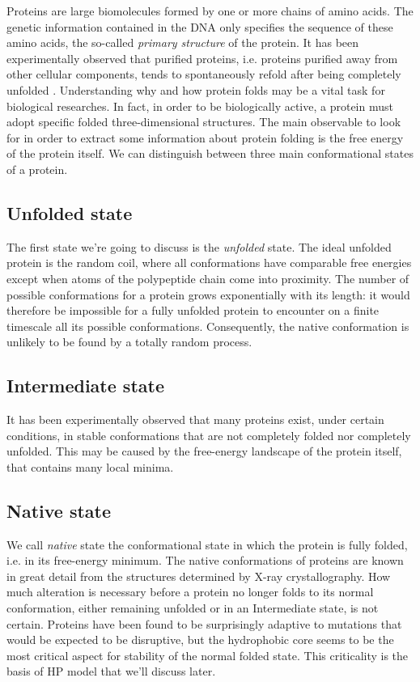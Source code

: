 Proteins are large biomolecules formed by one or more chains of amino acids.
The genetic information contained in the DNA only specifies the sequence of these amino acids, the so-called \emph{primary structure} of the protein.
It has been experimentally observed that purified proteins, i.e. proteins purified away from other cellular components, tends to spontaneously refold after being completely unfolded \cite{ProteinFolding1990}.
Understanding why and how protein folds may be a vital task for biological researches.
In fact, in order to be biologically active, a protein must adopt specific folded three-dimensional structures.
The main observable to look for in order to extract some information about protein folding is the free energy of the protein itself.
We can distinguish between three main conformational states of a protein.

\subsection*{Unfolded state}
The first state we're going to discuss is the \emph{unfolded} state.
The ideal unfolded protein is the random coil, where all conformations have comparable free energies except when atoms of the polypeptide chain come into proximity.
The number of possible conformations for a protein grows exponentially with its length: it would therefore be impossible for a fully unfolded protein to encounter on a finite timescale all its possible conformations.
Consequently, the native conformation is unlikely to be found by a totally random process.

\subsection*{Intermediate state}
It has been experimentally observed that many proteins exist, under certain conditions, in stable conformations that are not completely folded nor completely unfolded.
This may be caused by the free-energy landscape of the protein itself, that contains many local minima.


\subsection*{Native state}
We call \emph{native} state the conformational state in which the protein is fully folded, i.e. in its free-energy minimum.
The native conformations of proteins are known in great detail from the structures determined by X-ray crystallography.
How much alteration is necessary before a protein no longer folds to its normal conformation, either remaining unfolded or in an Intermediate state, is not certain.
Proteins have been found to be surprisingly adaptive to mutations that would be expected to be disruptive, but the hydrophobic core seems to be the most critical aspect for stability of the normal folded state.
This criticality is the basis of HP model that we'll discuss later.